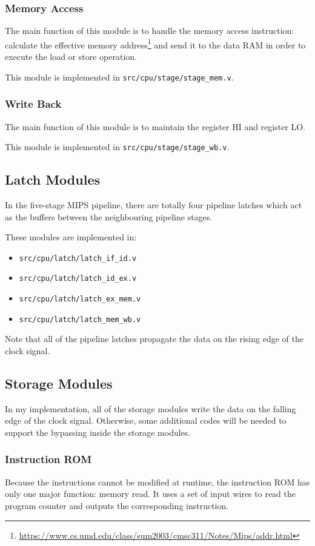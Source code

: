 \documentclass{article}
\begin{document}
\newpage
\subsubsection{Memory Access}
The main function of this module is to handle the memory access instruction: calculate the effective memory address\footnote{\url{https://www.cs.umd.edu/class/sum2003/cmsc311/Notes/Mips/addr.html}} and send it to the data RAM in order to execute the load or store operation.


This module is implemented in \texttt{src/cpu/stage/stage\_mem.v}.

\newpage
\subsubsection{Write Back}
The main function of this module is to maintain the register HI and register LO.


This module is implemented in \texttt{src/cpu/stage/stage\_wb.v}.

\subsection{Latch Modules}
In the five-stage MIPS pipeline, there are totally four pipeline latches which act as the buffers between the neighbouring pipeline stages. 

These modules are implemented in:
\begin{itemize}
\item
\texttt{src/cpu/latch/latch\_if\_id.v}
\item
\texttt{src/cpu/latch/latch\_id\_ex.v}
\item
\texttt{src/cpu/latch/latch\_ex\_mem.v}
\item
\texttt{src/cpu/latch/latch\_mem\_wb.v}
\end{itemize}
Note that all of the pipeline latches propagate the data on the rising edge of the clock signal.

\subsection{Storage Modules}
In my implementation, all of the storage modules write the data on the falling edge of the clock signal. Otherwise, some additional codes will be needed to support the bypassing inside the storage modules.

\subsubsection{Instruction ROM}
Because the instructions cannot be modified at runtime, the instruction ROM has only one major function: memory read. It uses a set of input wires to read the program counter and outputs the corresponding instruction.
\end{document}
